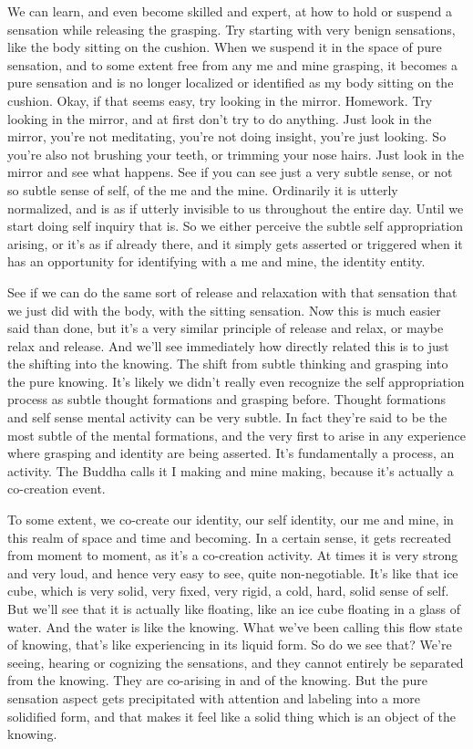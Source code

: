 \documentclass[12pt,openany]{book}
\begin{document}
We can learn, and even become skilled and expert, at how to hold or suspend a sensation while releasing the grasping. Try starting with very benign sensations, like the body sitting on the cushion. When we suspend it in the space of pure sensation, and to some extent free from any me and mine grasping, it becomes a pure sensation and is no longer localized or identified as my body sitting on the cushion. Okay, if that seems easy, try looking in the mirror. Homework. Try looking in the mirror, and at first don't try to do anything. Just look in the mirror, you're not meditating, you're not doing insight, you're just looking. So you're also not brushing your teeth, or trimming your nose hairs. Just look in the mirror and see what happens. See if you can see just a very subtle sense, or not so subtle sense of self, of the me and the mine. Ordinarily it is utterly normalized, and is as if utterly invisible to us throughout the entire day. Until we start doing self inquiry that is. So we either perceive the subtle self appropriation arising, or it's as if already there, and it simply gets asserted or triggered when it has an opportunity for identifying with a me and mine, the identity entity. 

See if we can do the same sort of release and relaxation with that sensation that we just did with the body, with the sitting sensation. Now this is much easier said than done, but it's a very similar principle of release and relax, or maybe relax and release. And we'll see immediately how directly related this is to just the shifting into the knowing. The shift from subtle thinking and grasping into the pure knowing. It's likely we didn't really even recognize the self appropriation process as subtle thought formations and grasping before. Thought formations and self sense mental activity can be very subtle. In fact they're said to be the most subtle of the mental formations, and the very first to arise in any experience where grasping and identity are being asserted. It’s fundamentally a process, an activity. The Buddha calls it I making and mine making, because it's actually a co-creation event.

To some extent, we co-create our identity, our self identity, our me and mine, in this realm of space and time and becoming. In a certain sense, it gets recreated from moment to moment, as it's a co-creation activity. At times it is very strong and very loud, and hence very easy to see, quite non-negotiable. It's like that ice cube, which is very solid, very fixed, very rigid, a cold, hard, solid sense of self. But we'll see that it is actually like floating, like an ice cube floating in a glass of water. And the water is like the knowing. What we’ve been calling this flow state of knowing, that's like experiencing in its liquid form. So do we see that? We're seeing, hearing or cognizing the sensations, and they cannot entirely be separated from the knowing. They are co-arising in and of the knowing. But the pure sensation aspect gets precipitated with attention and labeling into a more solidified form, and that makes it feel like a solid thing which is an object of the knowing. 
\end{document}
